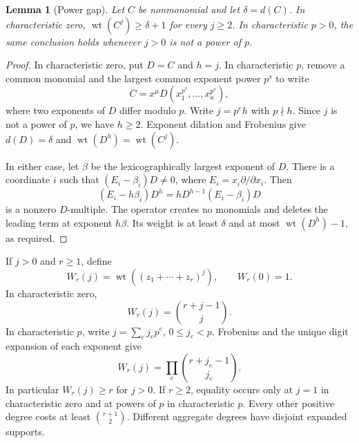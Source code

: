 \documentclass[11pt]{article}
\DeclareMathOperator{\wt}{wt}\DeclareMathOperator{\ord}{ord}
\numberwithin{equation}{section}
\newtheorem{lemma}[theorem]{Lemma}
\theoremstyle{definition}\newtheorem{definition}[theorem]{Definition}
\theoremstyle{remark}\newtheorem{remark}[theorem]{Remark}
\begin{document}
\begin{lemma}[Power gap]\label{lem:powergap}
Let $C$ be nonmonomial and let $\delta=d(C)$. In characteristic
zero, $\wt(C^j)\ge\delta+1$ for every $j\ge2$. In characteristic
$p>0$, the same conclusion holds whenever $j>0$ is not a power of $p$.
\end{lemma}
\begin{proof}
In characteristic zero, put $D=C$ and $h=j$. In characteristic $p$,
remove a common monomial and the largest common exponent power $p^s$
to write
\[
 C=x^\mu D(x_1^{p^s},\ldots,x_a^{p^s}),
\]
where two exponents of $D$ differ modulo $p$. Write $j=p^eh$ with
$p\nmid h$. Since $j$ is not a power of $p$, we have $h\ge2$.
Exponent dilation and Frobenius give $d(D)=\delta$ and
$\wt(D^h)=\wt(C^j)$.

In either case, let $\beta$ be the lexicographically largest exponent
of $D$. There is a coordinate $i$ such that
$(E_i-\beta_i)D\ne0$, where $E_i=x_i\partial/\partial x_i$.
Then
\[
 (E_i-h\beta_i)D^h=hD^{h-1}(E_i-\beta_i)D
\]
is a nonzero $D$-multiple. The operator creates no monomials and
deletes the leading term at exponent $h\beta$. Its weight is at
least $\delta$ and at most $\wt(D^h)-1$, as required.
\end{proof}

If $j>0$ and $r\ge1$, define
\[
 W_r(j)=\wt((z_1+\cdots+z_r)^j),\qquad W_r(0)=1.
\]
In characteristic zero,
\[
 W_r(j)=\binom{r+j-1}{j}.
\]
In characteristic $p$, write $j=\sum_e j_ep^e$, $0\le j_e<p$.
Frobenius and the unique digit expansion of each exponent give
\begin{equation}\label{eq:digitcost}
 W_r(j)=\prod_e\binom{r+j_e-1}{j_e}.
\end{equation}
In particular $W_r(j)\ge r$ for $j>0$. If $r\ge2$, equality occurs
only at $j=1$ in characteristic zero and at powers of $p$ in
characteristic $p$. Every other positive degree costs at least
$\binom{r+1}{2}$. Different aggregate degrees have disjoint expanded
supports.
\end{document}

